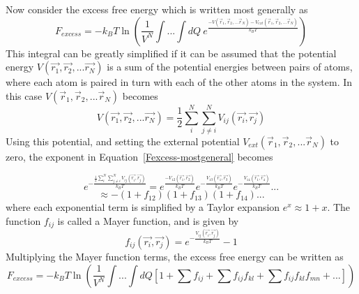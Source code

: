 \documentclass[double,12pt]{beavtex}
\begin{document}
Now consider the excess free energy which is written most generally as
\begin{equation}\label{Fexcess-mostgeneral}{F_{excess}= -k_BT\ln{\left(\frac{1}{V^N}\int{...}\int{dQ}~e^\frac{-V(\vec{r}_1, \vec{r}_2,...\vec{r}_N)-V_{ext}(\vec{r}_1, \vec{r}_2,...\vec{r}_N)}{k_BT}\right)}}\end{equation} 
This integral can be greatly simplified if it can be assumed that the 
potential energy $V(\vec{r_1},\vec{r_2},...\vec{r_N})$ is a sum of the 
potential energies between pairs of atoms, where each atom is paired in 
turn with each of the other atoms in the system. In this case 
$V(\vec{r}_1, \vec{r}_2,...\vec{r}_N)$ becomes 
\begin{equation}{V(\vec{r_1},\vec{r_2},...\vec{r_N})=\frac{1}{2}\sum^N_i\sum^N_{j\neq{i}}V_{ij}(\vec{r_i},\vec{r_j})}\end{equation} 
Using this potential, and setting the external potential 
$V_{ext}(\vec{r}_1, \vec{r}_2,...\vec{r}_N)$ to zero, the exponent in 
Equation~\ref{Fexcess-mostgeneral} becomes

\begin{displaymath}{e^{-\frac{\frac{1}{2}\sum^N_i\sum^N_{j\neq{i}}V_{ij}(\vec{r_i},\vec{r_j})}{k_BT}}=e^{\frac{-V_{12}(\vec{r_1},\vec{r_2})}{k_BT}}e^{-\frac{V_{13}(\vec{r_1},\vec{r_3})}{k_BT}}e^{-\frac{V_{14}(\vec{r_1},\vec{r_4})}{k_BT}}...}\end{displaymath}    \begin{equation}{\approx-(1+f_{12})(1+f_{13})(1+f_{14})...}\end{equation}
where each exponential term is simplified by a Taylor expansion $e^x\approx{1+x}$. 
The function $f_{ij}$ is called a Mayer function, and is given by
\begin{equation}\label{eq:mayerfunction}{f_{ij}(\vec{r_i},\vec{r_j})=e^{-\frac{V_{ij}(\vec{r_i},\vec{r_j})}{k_BT}}-1}\end{equation} 
Multiplying the Mayer function terms, the excess free energy can be written as
\begin{equation}\label{eq:Fexcess-simplified}{F_{excess}=-k_BT\ln{\left(\frac{1}{V^N}\int{...}\int{dQ}\left[1 + \sum{f_{ij}} + \sum{f_{ij}f_{kl}} +\sum{f_{ij}f_{kl}f_{mn}} +... \right]\right)  }}\end{equation}
\end{document}
